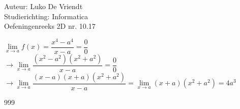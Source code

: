 \documentclass[a4paper]{article}
\begin{document}
\noindent \large Auteur: Luko De Vriendt\\
\noindent \large Studierichting: Informatica\\
\noindent \large Oefeningenreeks 2D nr. 10.17\\

\medskip

\normalsize


$\lim\limits_{x \rightarrow a} f(x) = \dfrac{x^4 - a^4}{x - a} = \dfrac{0}{0}$ \\

$\rightarrow \lim\limits_{x \rightarrow a} \dfrac{(x^2 - a^2)(x^2 + a^2)}{x - a} = \dfrac{0}{0}$ \\

$\rightarrow \lim\limits_{x \rightarrow a} \dfrac{(x - a)(x + a)(x^2 + a^2)}{x - a} = \lim\limits_{x \rightarrow a} (x + a)(x^2 + a^2) = 4a^3$ \\




\begin{thebibliography}{999}
\end{thebibliography}
\end{document}
